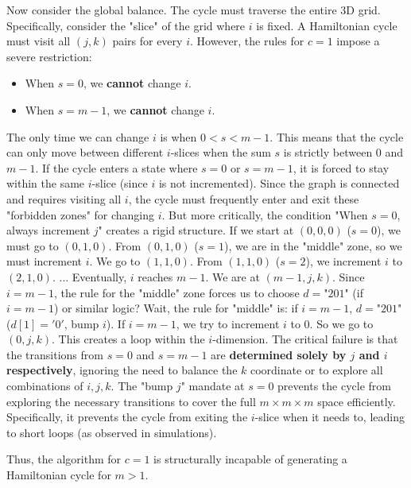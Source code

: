 \documentclass[12pt]{article}
\begin{document}
Now consider the global balance. The cycle must traverse the entire 3D grid.
Specifically, consider the "slice" of the grid where $i$ is fixed. A Hamiltonian cycle must visit all $(j, k)$ pairs for every $i$.
However, the rules for $c=1$ impose a severe restriction:
\begin{itemize}
    \item When $s=0$, we \textbf{cannot} change $i$.
    \item When $s=m-1$, we \textbf{cannot} change $i$.
\end{itemize}
The only time we can change $i$ is when $0 < s < m-1$.
This means that the cycle can only move between different $i$-slices when the sum $s$ is strictly between 0 and $m-1$.
If the cycle enters a state where $s=0$ or $s=m-1$, it is forced to stay within the same $i$-slice (since $i$ is not incremented).
Since the graph is connected and requires visiting all $i$, the cycle must frequently enter and exit these "forbidden zones" for changing $i$.
But more critically, the condition "When $s=0$, always increment $j$" creates a rigid structure.
If we start at $(0,0,0)$ ($s=0$), we must go to $(0,1,0)$.
From $(0,1,0)$ ($s=1$), we are in the "middle" zone, so we must increment $i$. We go to $(1,1,0)$.
From $(1,1,0)$ ($s=2$), we increment $i$ to $(2,1,0)$.
...
Eventually, $i$ reaches $m-1$. We are at $(m-1, j, k)$. Since $i=m-1$, the rule for the "middle" zone forces us to choose $d=\text{"201"}$ (if $i=m-1$) or similar logic?
Wait, the rule for "middle" is: if $i=m-1$, $d=\text{"201"}$ ($d[1]='0'$, bump $i$). If $i=m-1$, we try to increment $i$ to $0$.
So we go to $(0, j, k)$.
This creates a loop within the $i$-dimension.
The critical failure is that the transitions from $s=0$ and $s=m-1$ are \textbf{determined solely by $j$ and $i$ respectively}, ignoring the need to balance the $k$ coordinate or to explore all combinations of $i, j, k$. The "bump $j$" mandate at $s=0$ prevents the cycle from exploring the necessary transitions to cover the full $m \times m \times m$ space efficiently. Specifically, it prevents the cycle from exiting the $i$-slice when it needs to, leading to short loops (as observed in simulations).

Thus, the algorithm for $c=1$ is structurally incapable of generating a Hamiltonian cycle for $m > 1$.
\end{document}
